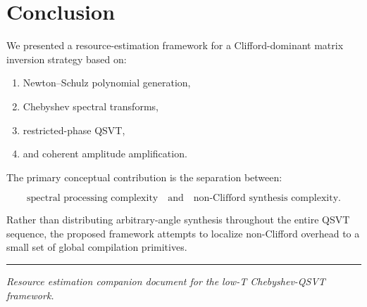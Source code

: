 \documentclass[12pt,a4paper]{article}
\begin{document}

\section{Conclusion}

We presented a resource-estimation framework for a Clifford-dominant matrix inversion strategy based on:

\begin{enumerate}
    \item Newton--Schulz polynomial generation,
    \item Chebyshev spectral transforms,
    \item restricted-phase QSVT,
    \item and coherent amplitude amplification.
\end{enumerate}

The primary conceptual contribution is the separation between:

\[
\text{spectral processing complexity}
\quad\text{and}\quad
\text{non-Clifford synthesis complexity}.
\]

Rather than distributing arbitrary-angle synthesis throughout the entire QSVT sequence, the proposed framework attempts to localize non-Clifford overhead to a small set of global compilation primitives.

\vspace{2em}

\hrule

\vspace{1em}

\noindent
\textit{
Resource estimation companion document for the low-T Chebyshev-QSVT framework.
}
\end{document}

